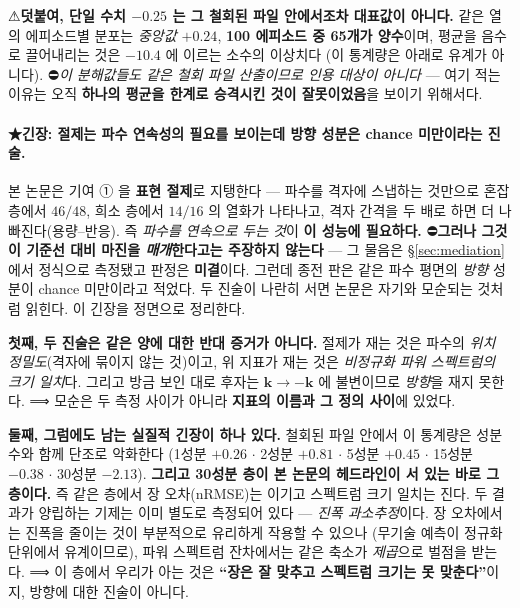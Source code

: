 \documentclass[11pt]{report}
\numberwithin{equation}{chapter}
\numberwithin{figure}{chapter}
\numberwithin{table}{chapter}
\begin{document}
⚠\textbf{덧붙여, 단일 수치 $-0.25$ 는 그 철회된 파일 안에서조차 대표값이 아니다.}
같은 열의 에피소드별 분포는 \emph{중앙값 $+0.24$}, \textbf{100 에피소드 중 65개가 양수}이며,
평균을 음수로 끌어내리는 것은 $-10.4$ 에 이르는 소수의 이상치다
(이 통계량은 아래로 유계가 아니다). ⛔\emph{이 분해값들도 같은 철회 파일 산출이므로
인용 대상이 아니다} --- 여기 적는 이유는 오직 \textbf{하나의 평균을 한계로 승격시킨 것이
잘못이었음}을 보이기 위해서다.

\paragraph{★긴장: 절제는 파수 연속성의 필요를 보이는데 방향 성분은 chance 미만이라는 진술.}
본 논문은 기여 ① 을 \textbf{표현 절제}로 지탱한다 --- 파수를 격자에 스냅하는 것만으로
혼잡 층에서 $46/48$, 희소 층에서 $14/16$ 의 열화가 나타나고, 격자 간격을 두 배로 하면
더 나빠진다(용량--반응). 즉 \emph{파수를 연속으로 두는 것}이 \textbf{이 성능에 필요하다.}
⛔\textbf{그러나 그것이 기준선 대비 마진을 \emph{매개}한다고는 주장하지 않는다} ---
그 물음은 \S\ref{sec:mediation}에서 정식으로 측정됐고 판정은 \textbf{미결}이다.
그런데 종전 판은 같은 파수 평면의 \emph{방향} 성분이 chance 미만이라고 적었다.
두 진술이 나란히 서면 논문은 자기와 모순되는 것처럼 읽힌다. 이 긴장을 정면으로 정리한다.

\textbf{첫째, 두 진술은 같은 양에 대한 반대 증거가 아니다.}
절제가 재는 것은 파수의 \emph{위치 정밀도}(격자에 묶이지 않는 것)이고, 위 지표가 재는 것은
\emph{비정규화 파워 스펙트럼의 크기 일치}다. 그리고 방금 보인 대로 후자는
$\mathbf{k} \to -\mathbf{k}$ 에 불변이므로 \emph{방향}을 재지 못한다.
⟹ 모순은 두 측정 사이가 아니라 \textbf{지표의 이름과 그 정의 사이}에 있었다.

\textbf{둘째, 그럼에도 남는 실질적 긴장이 하나 있다.}
철회된 파일 안에서 이 통계량은 성분 수와 함께 단조로 악화한다
(1성분 $+0.26$ $\cdot$ 2성분 $+0.81$ $\cdot$ 5성분 $+0.45$ $\cdot$
15성분 $-0.38$ $\cdot$ 30성분 $-2.13$). \textbf{그리고 30성분 층이 본 논문의 헤드라인이
서 있는 바로 그 층이다.} 즉 같은 층에서 장 오차(nRMSE)는 이기고 스펙트럼 크기 일치는 진다.
두 결과가 양립하는 기제는 이미 별도로 측정되어 있다 --- \emph{진폭 과소추정}이다.
장 오차에서는 진폭을 줄이는 것이 부분적으로 유리하게 작용할 수 있으나
(무기술 예측이 정규화 단위에서 유계이므로), 파워 스펙트럼 잔차에서는 같은 축소가
\emph{제곱}으로 벌점을 받는다. ⟹ 이 층에서 우리가 아는 것은
\textbf{``장은 잘 맞추고 스펙트럼 크기는 못 맞춘다''}이지, 방향에 대한 진술이 아니다.
\end{document}
